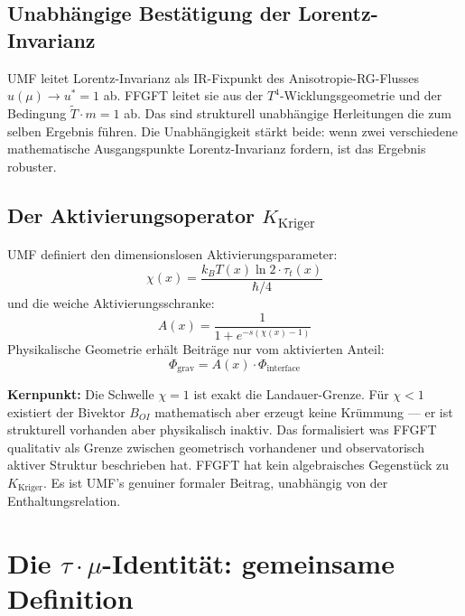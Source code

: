 \subsection{Unabhängige Bestätigung der Lorentz-Invarianz}

UMF leitet Lorentz-Invarianz als IR-Fixpunkt des Anisotropie-RG-Flusses
$u(\mu) \to u^* = 1$ ab. FFGFT leitet sie aus der $T^4$-Wicklungsgeometrie
und der Bedingung $\tilde{T}\cdot m = 1$ ab. Das sind strukturell unabhängige
Herleitungen die zum selben Ergebnis führen. Die Unabhängigkeit stärkt beide:
wenn zwei verschiedene mathematische Ausgangspunkte Lorentz-Invarianz fordern,
ist das Ergebnis robuster.

\subsection{Der Aktivierungsoperator \texorpdfstring{$K_\text{Kriger}$}{K\_Kriger}}
\label{sec:kriger}

UMF definiert den dimensionslosen Aktivierungsparameter:
\begin{equation}
  \chi(x) = \frac{k_B T(x)\ln 2 \cdot \tau_t(x)}{\hbar/4}
  \tag{244.6a}
\end{equation}
und die weiche Aktivierungsschranke:
\begin{equation}
  A(x) = \frac{1}{1+e^{-s(\chi(x)-1)}}
  \tag{244.6b}
\end{equation}
Physikalische Geometrie erhält Beiträge nur vom aktivierten Anteil:
\begin{equation}
  \Phi_\text{grav} = A(x) \cdot \Phi_\text{interface}
  \tag{244.6c}
\end{equation}

\textbf{Kernpunkt:} Die Schwelle $\chi = 1$ ist exakt die Landauer-Grenze.
Für $\chi < 1$ existiert der Bivektor $B_{OI}$ mathematisch aber erzeugt keine
Krümmung — er ist strukturell vorhanden aber physikalisch inaktiv. Das
formalisiert was FFGFT qualitativ als Grenze zwischen geometrisch vorhandener
und observatorisch aktiver Struktur beschrieben hat. FFGFT hat kein algebraisches
Gegenstück zu $K_\text{Kriger}$. Es ist UMF's genuiner formaler Beitrag,
unabhängig von der Enthaltungsrelation.

\section{\texorpdfstring{Die $\tau\cdot\mu$-Identität}{Die tau.mu-Identität}: gemeinsame Definition}

